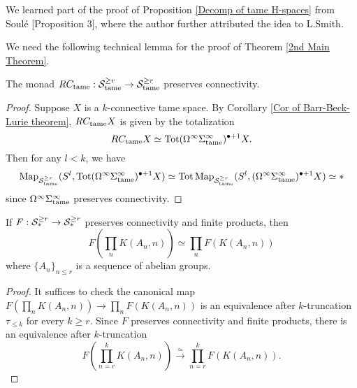 \begin{remark}
		We learned part of the proof of Proposition \ref{Decomp of tame H-spaces} from Soul\'e \cite{soule}[Proposition 3], where the author further attributed the idea to L.Smith.	 
\end{remark}

We need the following technical lemma for the proof of Theorem \ref{2nd Main Theorem}.
\begin{lemma}
\label{RC_tame preserves connectivity}
The monad $RC_{\operatorname{\operatorname{tame}}}: {\mathcal{S}}^{\geq r}_{\operatorname{\operatorname{tame}}} \to 
{\mathcal{S}}^{\geq r}_{\operatorname{\operatorname{tame}}}$ preserves connectivity.
\end{lemma}
\begin{proof}
Suppose $X$ is a $k$-connective tame space.
By Corollary \ref{Cor of Barr-Beck-Lurie theorem}, 
$RC_{\operatorname{\operatorname{tame}}} X$ is given by the totalization 
$$
RC_{\operatorname{\operatorname{tame}}} X \simeq \operatorname{\operatorname{Tot}} (\Omega^{\infty} \Sigma^{\infty}_{\operatorname{\operatorname{tame}}})^{\bullet +1}  X.
$$
Then for any $l<k$, we have
$$
\operatorname{Map}_{{\mathcal{S}}^{\geq r}_{\operatorname{\operatorname{tame}}}}(S^l, \operatorname{\operatorname{Tot}} (\Omega^{\infty} \Sigma^{\infty}_{\operatorname{\operatorname{tame}}})^{\bullet +1}  X) \simeq 
\operatorname{\operatorname{Tot}} \operatorname{Map}_{{\mathcal{S}}^{\geq r}_{\operatorname{\operatorname{tame}}}}(S^l,  (\Omega^{\infty} \Sigma^{\infty}_{\operatorname{\operatorname{tame}}})^{\bullet +1}  X) \simeq *
$$
since $\Omega^{\infty}\Sigma^{\infty}_{\operatorname{\operatorname{tame}}}$ preserves connectivity.

\end{proof}

\begin{corollary}
\label{RV commutes infinite products of EM-spaces}
If $F:{\mathcal{S}}^{\geq r}_* \to {\mathcal{S}}^{\geq r}_*$ preserves connectivity and finite products, then 
$$
F(\prod_n K(A_n, n)) \simeq \prod_n F(K(A_n, n))
$$
where $\{A_n\}_{n\leq r}$ is a sequence of abelian groups.
\end{corollary}
\begin{proof}
It suffices to check the canonical map 
$F(\prod_n K(A_n, n)) \to \prod_n F(K(A_n, n))$ is an equivalence after $k$-truncation $\tau_{\leq k}$ for every $k\geq r$. Since $F$ preserves connectivity and finite products, there is an equivalence after $k$-truncation
$$
F(\prod_{n=r}^{k} K(A_n, n)) \xrightarrow{\simeq} \prod_{n=r}^{k}F( K(A_n,n)).
$$
\end{proof}

